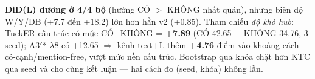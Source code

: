 \begin{table}[t]
\vspace{2pt}
\begin{minipage}{\linewidth}\footnotesize\raggedright
\textbf{DiD(L) dương ở 4/4 bộ} (hướng CÓ $>$ KHÔNG nhất quán), nhưng biên độ W/Y/DB (+7.7 đến +18.2)
lớn hơn hẳn v2 (+0.85). Tham chiếu \emph{độ khó hub}: TuckER cấu trúc có mức CÓ$-$KHÔNG = \textbf{+7.89}
(CÓ 42.65 $-$ KHÔNG 34.76, 3 seed); A3$'$* $\lambda$8 có +12.65 $\Rightarrow$ kênh text+L thêm
\textbf{+4.76} điểm vào khoảng cách có-cạnh/mention-free, vượt mức nền cấu trúc. Bootstrap qua khóa
chặt hơn KTC qua seed và cho cùng kết luận --- hai cách đo (seed, khóa) không lẫn.
\end{minipage}
\end{table}
